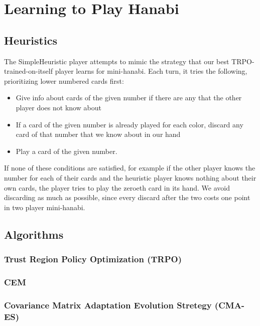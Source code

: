 \section{Learning to Play Hanabi}\label{sec:learninghanabi}


\subsection{Heuristics}

The SimpleHeuristic player attempts to mimic the strategy that our best
TRPO-trained-on-itself player learns for mini-hanabi. Each turn, it tries the
following, prioritizing lower numbered cards first:

\begin{itemize}
\item Give info about cards of the given number if there are any that the other player does not know about
\item If a card of the given number is already played for each color, discard any card of that number that we know about in our hand
\item Play a card of the given number.
\end{itemize}

If none of these conditions are satisfied, for example if the other player
knows the number for each of their cards and the heuristic player knows
nothing about their own cards, the player tries to play the zeroeth card in
its hand. We avoid discarding as much as possible, since every discard after
the two costs one point in two player mini-hanabi.




\subsection{Algorithms}
%
%
\subsubsection{Trust Region Policy Optimization (TRPO)}
\cite{TRPO}
\subsubsection{CEM}
\subsubsection{Covariance Matrix Adaptation Evolution Stretegy (CMA-ES)}
~\cite{cmaes}





